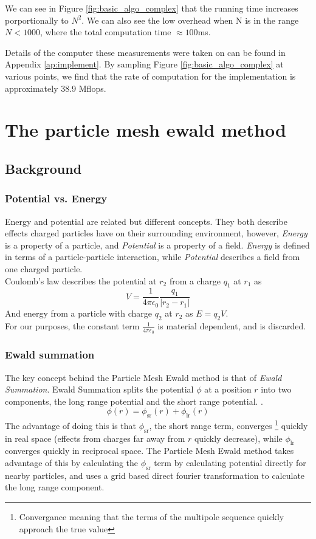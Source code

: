 \documentclass[pdftex,twoside,a4paper]{report}
\newcommand{\pmem}{Particle Mesh Ewald method}
\begin{document}
We can see in Figure \ref{fig:basic_algo_complex} that the running time increases porportionally to $N^2$. We can also see the low overhead when N is in the range $N < 1000$, where the total computation time $\approx 100$ms.

Details of the computer these measurements were taken on can be found in Appendix \ref{ap:implement}. By sampling Figure \ref{fig:basic_algo_complex} at various points, we find that the rate of computation for the implementation is approximately 38.9 Mflops.

\section{The particle mesh ewald method}
\subsection{Background}
\subsubsection{Potential vs. Energy}
Energy and potential are related but different concepts. They both describe effects charged particles have on their surrounding environment, however, \emph{Energy} is a property of a particle, and \emph{Potential} is a property of a field. \emph{Energy} is defined in terms of a particle-particle interaction, while \emph{Potential} describes a field from one charged particle.\\
Coulomb's law describes the potential at $r_2$ from a charge $q_1$ at $r_1$ as 
\[V=\frac{1}{4\pi \epsilon_0} \frac{q_1}{|r_2 - r_1|}\]
And energy from a particle with charge $q_2$ at $r_2$ as $E = q_2 V$.\\
For our purposes, the constant term $\frac{1}{4\pi \epsilon_0}$ is material dependent, and is discarded.
\subsubsection{Ewald summation}
The key concept behind the \pmem{} is that of \emph{Ewald Summation}. Ewald Summation splits the potential $\phi$ at a position $r$ into two components, the long range potential and the short range potential. \cite{petersen:3668}.
\[
\phi(r) = \phi_{\text{sr}}(r) + \phi_{\text{lr}}(r)
\]
The advantage of doing this is that $\phi_{\text{sr}}$, the short range term, converges \footnote{Convergance meaning that the terms of the multipole sequence quickly approach the true value} quickly in real space (effects from charges far away from $r$ quickly decrease), while $\phi_{\text{lr}}$ converges quickly in reciprocal space. The \pmem{} takes advantage of this by calculating the $\phi_{\text{sr}}$ term by calculating potential directly for nearby particles, and uses a grid based direct fourier transformation to calculate the long range component.
\end{document}
